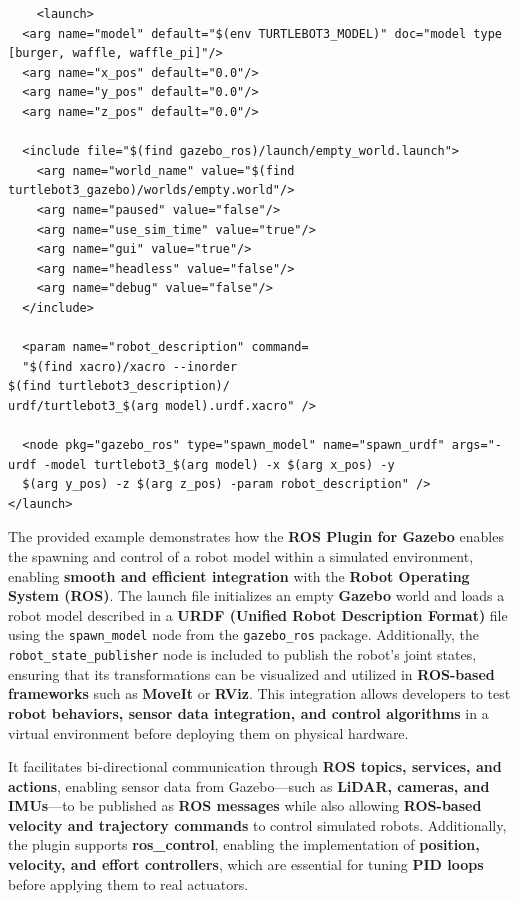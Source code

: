 \documentclass[../../main]{subfiles}
\begin{document}
\begin{verbatim}
    <launch>
  <arg name="model" default="$(env TURTLEBOT3_MODEL)" doc="model type [burger, waffle, waffle_pi]"/>
  <arg name="x_pos" default="0.0"/>
  <arg name="y_pos" default="0.0"/>
  <arg name="z_pos" default="0.0"/>

  <include file="$(find gazebo_ros)/launch/empty_world.launch">
    <arg name="world_name" value="$(find turtlebot3_gazebo)/worlds/empty.world"/>
    <arg name="paused" value="false"/>
    <arg name="use_sim_time" value="true"/>
    <arg name="gui" value="true"/>
    <arg name="headless" value="false"/>
    <arg name="debug" value="false"/>
  </include>

  <param name="robot_description" command=
  "$(find xacro)/xacro --inorder 
$(find turtlebot3_description)/
urdf/turtlebot3_$(arg model).urdf.xacro" />

  <node pkg="gazebo_ros" type="spawn_model" name="spawn_urdf" args="-urdf -model turtlebot3_$(arg model) -x $(arg x_pos) -y 
  $(arg y_pos) -z $(arg z_pos) -param robot_description" />
</launch>
\end{verbatim}
The provided example demonstrates how the \textbf{ROS Plugin for Gazebo} enables the spawning and control of a robot model 
within a simulated environment, enabling \textbf{smooth and efficient integration} with the \textbf{Robot Operating System (ROS)}. 
The launch file initializes an empty \textbf{Gazebo} world and loads a robot model described in a 
\textbf{URDF (Unified Robot Description Format)} file using the \texttt{spawn\_model} node from the \texttt{gazebo\_ros} package. 
Additionally, the \texttt{robot\_state\_publisher} node is included to publish the robot’s joint states, 
ensuring that its transformations can be visualized and utilized in \textbf{ROS-based frameworks} such as \textbf{MoveIt} or \textbf{RViz}. 
This integration allows developers to test \textbf{robot behaviors, sensor data integration, and control algorithms} in a virtual environment 
before deploying them on physical hardware.  

It facilitates bi-directional communication through \textbf{ROS topics, services, and actions}, 
enabling sensor data from Gazebo—such as \textbf{LiDAR, cameras, and IMUs}—to be published as \textbf{ROS messages} 
while also allowing \textbf{ROS-based velocity and trajectory commands} to control simulated robots. 
Additionally, the plugin supports \textbf{ros\_control}, enabling the implementation of \textbf{position, velocity, and effort controllers}, 
which are essential for tuning \textbf{PID loops} before applying them to real actuators.  
\end{document}
